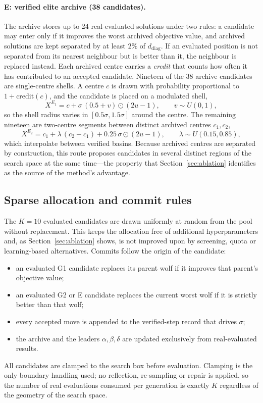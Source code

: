 \documentclass[11pt,a4paper]{article}
\begin{document}
\paragraph{E: verified elite archive (38 candidates).} The archive stores up
to 24 real-evaluated solutions under two rules: a candidate may enter only if
it improves the worst archived objective value, and archived solutions are
kept separated by at least $2\%$ of $d_{\mathrm{diag}}$. If an evaluated
position is not separated from its nearest neighbour but is better than it,
the neighbour is replaced instead. Each archived centre carries a
\emph{credit} that counts how often it has contributed to an accepted
candidate. Nineteen of the 38 archive candidates are single-centre shells. A
centre $c$ is drawn with probability proportional to $1+\mathrm{credit}(c)$,
and the candidate is placed on a modulated shell,
\begin{equation}
X^{E_1}=c+\sigma\,(0.5+v)\odot(2u-1),\qquad v\sim U(0,1),
\end{equation}
so the shell radius varies in $[0.5\sigma,1.5\sigma]$ around the centre. The
remaining nineteen are two-centre segments between distinct archived centres
$c_1,c_2$,
\begin{equation}
X^{E_2}=c_1+\lambda\,(c_2-c_1)+0.25\,\sigma\odot(2u-1),
\qquad \lambda\sim U(0.15,0.85),
\label{eq:segment}
\end{equation}
which interpolate between verified basins. Because archived centres are
separated by construction, this route proposes candidates in several distinct
regions of the search space at the same time---the property that
Section~\ref{sec:ablation} identifies as the source of the method's
advantage.

\subsection{Sparse allocation and commit rules}
The $K=10$ evaluated candidates are drawn uniformly at random from the pool
without replacement. This keeps the allocation free of additional
hyperparameters and, as Section~\ref{sec:ablation} shows, is not improved upon
by screening, quota or learning-based alternatives. Commits follow the origin
of the candidate:
\begin{itemize}
\item an evaluated G1 candidate replaces its parent wolf if it improves that
parent's objective value;
\item an evaluated G2 or E candidate replaces the current worst wolf if it is
strictly better than that wolf;
\item every accepted move is appended to the verified-step record that drives
$\sigma$;
\item the archive and the leaders $\alpha,\beta,\delta$ are updated
exclusively from real-evaluated results.
\end{itemize}
All candidates are clamped to the search box before evaluation. Clamping is
the only boundary handling used; no reflection, re-sampling or repair is
applied, so the number of real evaluations consumed per generation is exactly
$K$ regardless of the geometry of the search space.
\end{document}
